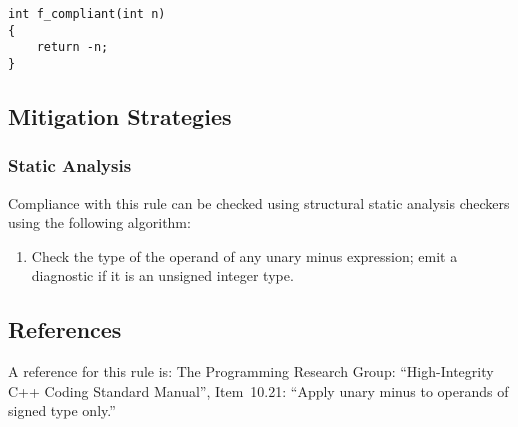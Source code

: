 \begin{verbatim}
int f_compliant(int n)
{
    return -n;
}
\end{verbatim}

\subsection{Mitigation Strategies}
\subsubsection{Static Analysis} 

Compliance with this rule can be checked using structural static analysis checkers using the following algorithm:

\begin{enumerate}
\item Check the type of the operand of any unary minus expression; emit a
diagnostic if it is an unsigned integer type.
\end{enumerate}

\subsection{References}

A reference for this rule is: The Programming Research Group: ``High-Integrity
C++ Coding Standard Manual'', Item~10.21: ``Apply unary minus to operands of
signed type only.''
